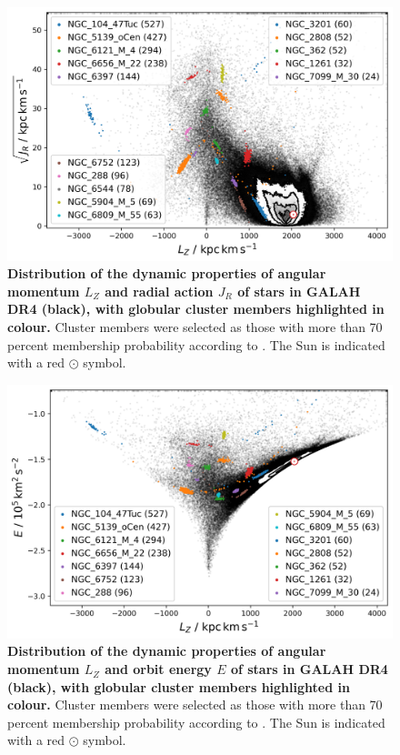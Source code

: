 \documentclass[
  journal=pasa,
  manuscript=research-paper, %
  year=2024,
  volume=37
]{cup-journal}
\begin{document}
\begin{figure}[ht]
\includegraphics[width=\columnwidth]{figures/galah_dr4_lz_jr_with_gcs.png}
\caption{
\textbf{Distribution of the dynamic properties of angular momentum $L_Z$ and radial action $J_R$ of stars in GALAH DR4 (black), with globular cluster members highlighted in colour.} Cluster members were selected as those with more than 70 percent membership probability according to \citet{Vasiliev2021}. The Sun is indicated with a red $\odot$ symbol.
}
\label{fig:galah_dr4_lz_jr_with_gcs}
\end{figure}

\begin{figure}[ht]
\includegraphics[width=\columnwidth]{figures/galah_dr4_lz_e_with_gcs.png}
\caption{
\textbf{Distribution of the dynamic properties of angular momentum $L_Z$ and orbit energy $E$ of stars in GALAH DR4 (black), with globular cluster members highlighted in colour.} Cluster members were selected as those with more than 70 percent membership probability according to \citet{Vasiliev2021}. The Sun is indicated with a red $\odot$ symbol.
}
\label{fig:galah_dr4_lz_e_with_gcs}
\end{figure}
\end{document}
